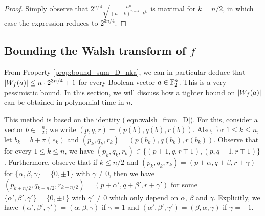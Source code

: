 \documentclass[11pt]{llncs}
\begin{document}
\begin{proof}
    Simply observe that $2^{n/4}\sqrt{\frac{n^n}{(n-k)^{n-k}\cdot k^k}}$ is maximal for $k=n/2$, in which case the expression reduces to $2^{3n/4}$.
\end{proof}

\subsection{Bounding the Walsh transform of $f$}

From Property \ref{prop:bound_sum_D_nka}, we can in particular deduce that $|W_{f}(a)|\leq n\cdot 2^{3n/4}+1$ for every Boolean vector $a\in\mathbb{F}_2^n$. This is a very pessimistic bound. In this section, we will discuss how a tighter bound on $|W_{f}(a)|$ can be obtained in polynomial time in $n$.

This method is based on the identity (\ref{eqn:walsh_from_D}). For this, consider a vector $b\in\mathbb F_2^n$; we write $(p,q,r)=(p(b),q(b),r(b))$. Also, for $1\leq k\leq n$, let $b_k=b+\pi(e_k)$ and $(p_k,q_k,r_k)=(p(b_k),q(b_k),r(b_k))$. Observe that for every $1\leq k\leq n$, we have $(p_k,q_k,r_k)\in\{(p\pm1,q,r\mp 1),(p,q\pm 1,r\mp 1)\}$. Furthermore, observe that if $k\leq n/2$ and $(p_k,q_k,r_k)=(p+\alpha,q+\beta,r+\gamma)$ for $\{\alpha,\beta,\gamma\}=\{0,\pm 1\}$ with $\gamma\neq 0$, then we have $(p_{k+n/2},q_{k+n/2},r_{k+n/2})=(p+\alpha',q+\beta',r+\gamma')$ for some $\{\alpha',\beta',\gamma'\}=\{0,\pm 1\}$ with $\gamma'\neq 0$ which only depend on $\alpha$, $\beta$ and $\gamma$. Explicitly, we have $(\alpha',\beta',\gamma')=(\alpha,\beta,\gamma)$ if $\gamma=1$ and $(\alpha',\beta',\gamma')=(\beta,\alpha,\gamma)$ if $\gamma=-1$.
\end{document}
